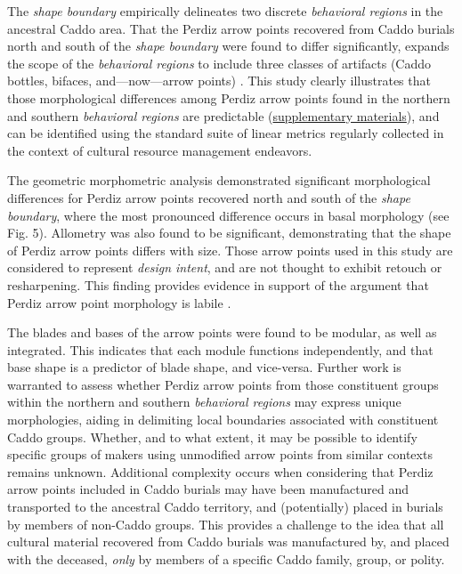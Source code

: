 \documentclass[smallextended]{svjour3}       %
\begin{document}
The \emph{shape boundary} empirically delineates two discrete
\emph{behavioral regions} in the ancestral Caddo area. That the Perdiz
arrow points recovered from Caddo burials north and south of the
\emph{shape boundary} were found to differ significantly, expands the
scope of the \emph{behavioral regions} to include three classes of
artifacts (Caddo bottles, bifaces, and---now---arrow points)
\cite{RN8074,RN7927,RN8370,RN8312,RN8322,RN8158}. This study clearly
illustrates that those morphological differences among Perdiz arrow
points found in the northern and southern \emph{behavioral regions} are
predictable (\href{https://seldenlab.github.io/perdiz3/}{supplementary
materials}), and can be identified using the standard suite of linear
metrics regularly collected in the context of cultural resource
management endeavors.

The geometric morphometric analysis demonstrated significant
morphological differences for Perdiz arrow points recovered north and
south of the \emph{shape boundary}, where the most pronounced difference
occurs in basal morphology (see Fig. 5). Allometry was also found to be
significant, demonstrating that the shape of Perdiz arrow points differs
with size. Those arrow points used in this study are considered to
represent \emph{design intent}, and are not thought to exhibit retouch
or resharpening. This finding provides evidence in support of the
argument that Perdiz arrow point morphology is labile \cite{RN9364}.

The blades and bases of the arrow points were found to be modular, as
well as integrated. This indicates that each module functions
independently, and that base shape is a predictor of blade shape, and
vice-versa. Further work is warranted to assess whether Perdiz arrow
points from those constituent groups within the northern and southern
\emph{behavioral regions} may express unique morphologies, aiding in
delimiting local boundaries associated with constituent Caddo groups.
Whether, and to what extent, it may be possible to identify specific
groups of makers using unmodified arrow points from similar contexts
remains unknown. Additional complexity occurs when considering that
Perdiz arrow points included in Caddo burials may have been manufactured
and transported to the ancestral Caddo territory, and (potentially)
placed in burials by members of non-Caddo groups. This provides a
challenge to the idea that all cultural material recovered from Caddo
burials was manufactured by, and placed with the deceased, \emph{only}
by members of a specific Caddo family, group, or polity.
\end{document}

